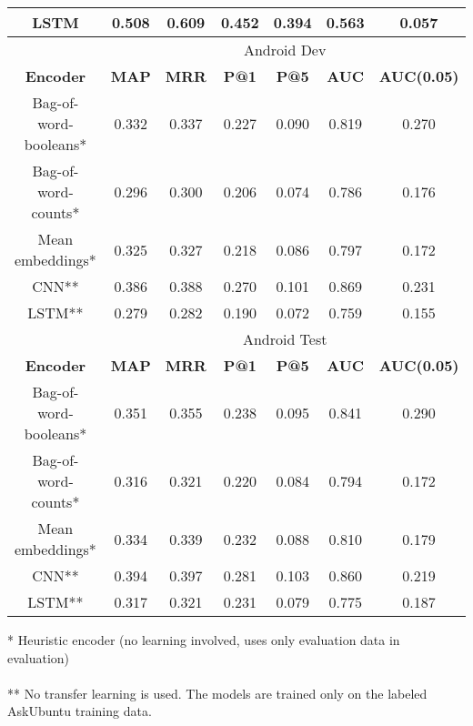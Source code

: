 \documentclass[12pt]{article}
\begin{document}
\begin{center}
\begin{tabular}{|c||c|c|c|c||c|c|}
			\cellcolor{green!15}LSTM & 0.508 & 0.609 & 0.452 & 0.394 & 0.563 & 0.057 \\ \hline
			\hline
			\cellcolor{gray!15}
				& \multicolumn{6}{c|}{\cellcolor{gray!15}Android Dev} \\ \hline
			\cellcolor{gray!15}\textbf{Encoder} & \cellcolor{gray!15}\textbf{MAP} & \cellcolor{gray!15}\textbf{MRR}
				& \cellcolor{gray!15}\textbf{P@1} & \cellcolor{gray!15}\textbf{P@5}
				& \cellcolor{gray!15}\textbf{AUC} & \cellcolor{gray!15}\textbf{AUC(0.05)} \\ \hline\hline
			\cellcolor{red!15}Bag-of-word-booleans* & 0.332 & 0.337 & 0.227 & 0.090 & 0.819 & 0.270 \\ \hline
			\cellcolor{red!15}Bag-of-word-counts* & 0.296 & 0.300 & 0.206 & 0.074 & 0.786 & 0.176 \\ \hline
			\cellcolor{red!15}Mean embeddings* & 0.325 & 0.327 & 0.218 & 0.086 & 0.797 & 0.172 \\ \hline\hline
			\cellcolor{green!15}CNN** & 0.386 & 0.388 & 0.270 & 0.101 & 0.869 & 0.231 \\ \hline
			\cellcolor{green!15}LSTM** & 0.279 & 0.282 & 0.190 & 0.072 & 0.759 & 0.155 \\ \hline
			\hline
			\cellcolor{gray!15}
				& \multicolumn{6}{c|}{\cellcolor{gray!15}Android Test} \\ \hline
			\cellcolor{gray!15}\textbf{Encoder} & \cellcolor{gray!15}\textbf{MAP} & \cellcolor{gray!15}\textbf{MRR}
				& \cellcolor{gray!15}\textbf{P@1} & \cellcolor{gray!15}\textbf{P@5}
				& \cellcolor{gray!15}\textbf{AUC} & \cellcolor{gray!15}\textbf{AUC(0.05)} \\ \hline\hline
			\cellcolor{red!15}Bag-of-word-booleans* & 0.351 & 0.355 & 0.238 & 0.095 & 0.841 & 0.290 \\ \hline
			\cellcolor{red!15}Bag-of-word-counts* & 0.316 & 0.321 & 0.220 & 0.084 & 0.794 & 0.172 \\ \hline
			\cellcolor{red!15}Mean embeddings* & 0.334 & 0.339 & 0.232 & 0.088 & 0.810 & 0.179 \\ \hline\hline
			\cellcolor{green!15}CNN** & 0.394 & 0.397 & 0.281 & 0.103 & 0.860 & 0.219 \\ \hline
			\cellcolor{green!15}LSTM** & 0.317 & 0.321 & 0.231 & 0.079 & 0.775 & 0.187 \\ \hline
		\end{tabular}
	\end{center}
	* Heuristic encoder (no learning involved, uses only evaluation data in evaluation) \\\\
	** No transfer learning is used. The models are trained only on the labeled AskUbuntu training data.
\end{document}
